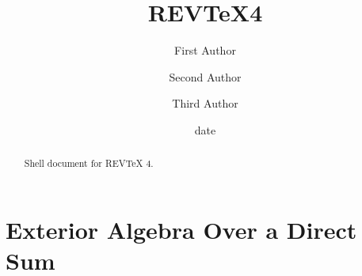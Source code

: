 \documentclass[aps,preprint]{revtex4}%
\begin{document}
\title[Short title for running header]{REV\TeX4}
\author{First Author}
\author{Second Author}
\author{Third Author}

\begin{abstract}
Shell document for REV\TeX{} 4.

\end{abstract}
\date[Date text]{date}




\maketitle
\tableofcontents


\part{Exterior Algebra Over a Direct Sum}
\end{document}
